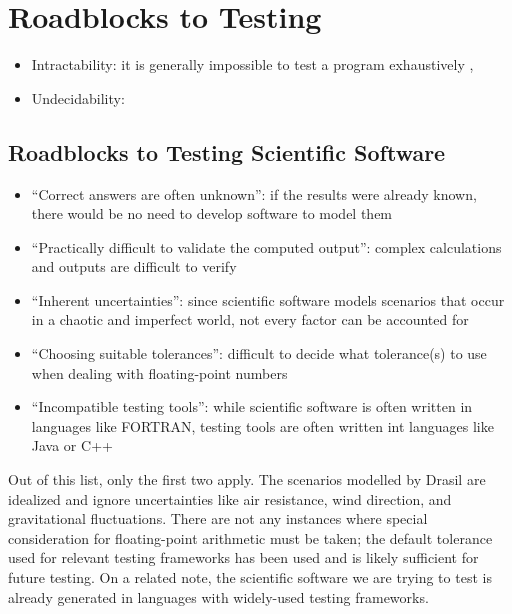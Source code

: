 \section{Roadblocks to Testing}

\begin{itemize}
      \item Intractability: it is generally impossible to test a program
            exhaustively \cite[p.~421]{van_vliet_software_2000},
            \cite[p.~439,461]{peters_software_2000}
      \item Undecidability: \cite[p.~439]{peters_software_2000}
\end{itemize}

\subsection{Roadblocks to Testing Scientific Software
      \cite[p.~67]{kanewala_metamorphic_2019}}
\label{chap:notes:sec:sci-testing-roadblocks}
\begin{itemize}
      \item ``Correct answers are often unknown'': if the results were already
            known, there would be no need to develop software to model them
            \cite[p.~67]{kanewala_metamorphic_2019}
      \item ``Practically difficult to validate the computed output'': complex
            calculations and outputs are difficult to verify
            \cite[p.~67]{kanewala_metamorphic_2019}
      \item ``Inherent uncertainties'': since scientific software models
            scenarios that occur in a chaotic and imperfect world, not every
            factor can be accounted for \cite[p.~67]{kanewala_metamorphic_2019}
      \item ``Choosing suitable tolerances'': difficult to decide what
            tolerance(s) to use when dealing with floating-point numbers
            \cite[p.~67]{kanewala_metamorphic_2019}
      \item ``Incompatible testing tools'': while scientific software is often
            written in languages like FORTRAN, testing tools are often written
            int languages like Java or C++ \cite[p.~67]{kanewala_metamorphic_2019}
\end{itemize}

Out of this list, only the first two apply. The scenarios modelled by Drasil
are idealized and ignore uncertainties like air resistance, wind direction,
and gravitational fluctuations. There are not any instances where special
consideration for floating-point arithmetic must be taken; the default
tolerance used for relevant testing frameworks has been used
 and is likely sufficient for future testing. On a related
note, the scientific software we are trying to test is already generated in
languages with widely-used testing frameworks. 
